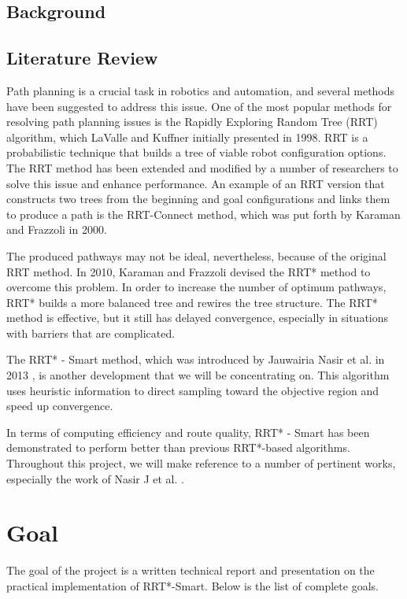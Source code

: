 \documentclass[12pt]{extarticle}
\begin{document}
\subsection{Background}

\subsection{Literature Review}
\hspace{\parindent}Path planning is a crucial task in robotics and automation, and several methods have been suggested to address this issue. One of the most popular methods for resolving path planning issues is the Rapidly Exploring Random Tree (RRT) algorithm, which LaValle and Kuffner \cite{La} initially presented in 1998. RRT is a probabilistic technique that builds a tree of viable robot configuration options. The RRT method has been extended and modified by a number of researchers to solve this issue and enhance performance. An example of an RRT version that constructs two trees from the beginning and goal configurations and links them to produce a path is the RRT-Connect method, which was put forth by Karaman and Frazzoli in 2000.

The produced pathways may not be ideal, nevertheless, because of the original RRT method. In 2010, Karaman and Frazzoli \cite{Kar} devised the RRT* method to overcome this problem. In order to increase the number of optimum pathways, RRT* builds a more balanced tree and rewires the tree structure. The RRT* method is effective, but it still has delayed convergence, especially in situations with barriers that are complicated.

The RRT* - Smart method, which was introduced by Jauwairia Nasir et al. in 2013 \cite{Jau}, is another development that we will be concentrating on. This algorithm uses heuristic information to direct sampling toward the objective region and speed up convergence.

In terms of computing efficiency and route quality, RRT* - Smart has been demonstrated to perform better than previous RRT*-based algorithms. Throughout this project, we will make reference to a number of pertinent works, especially the work of Nasir J et al. \cite{Jau}.

\section{Goal}
\hspace{\parindent}The goal of the project is a written technical report and presentation on the practical implementation of RRT*-Smart. Below is the list of complete goals.
\end{document}
